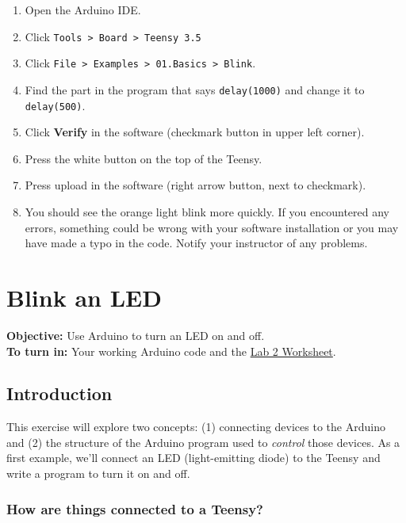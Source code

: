 \documentclass[]{book}
\providecommand{\tightlist}{%
  \setlength{\itemsep}{0pt}\setlength{\parskip}{0pt}}
\begin{document}
\begin{enumerate}
\def\labelenumi{\arabic{enumi}.}
\tightlist
\item
  Open the Arduino IDE.
\item
  Click \texttt{Tools\ \textgreater{}\ Board\ \textgreater{}\ Teensy\ 3.5}
\item
  Click \texttt{File\ \textgreater{}\ Examples\ \textgreater{}\ 01.Basics\ \textgreater{}\ Blink}.
\item
  Find the part in the program that says \texttt{delay(1000)} and change it to \texttt{delay(500)}.
\item
  Click \textbf{Verify} in the software (checkmark button in upper left corner).
\item
  Press the white button on the top of the Teensy.
\item
  Press upload in the software (right arrow button, next to checkmark).
\item
  You should see the orange light blink more quickly. If you encountered any errors, something could be wrong with your software installation or you may have made a typo in the code. Notify your instructor of any problems.
\end{enumerate}

\hypertarget{blink-an-led}{%
\chapter{Blink an LED}\label{blink-an-led}}

\textbf{Objective:} Use Arduino to turn an LED on and off.\\
\textbf{To turn in:} Your working Arduino code and the \href{https://github.com/alphonse/alphonse.github.io/raw/master/CHEM191/pdf/lab2_Blink.pdf}{Lab 2 Worksheet}.

\hypertarget{introduction-1}{%
\section*{Introduction}\label{introduction-1}}

This exercise will explore two concepts: (1) connecting devices to the Arduino and (2) the structure of the Arduino program used to \emph{control} those devices. As a first example, we'll connect an LED (light-emitting diode) to the Teensy and write a program to turn it on and off.

\hypertarget{how-are-things-connected-to-a-teensy}{%
\subsection*{How are things connected to a Teensy?}\label{how-are-things-connected-to-a-teensy}}
\end{document}
